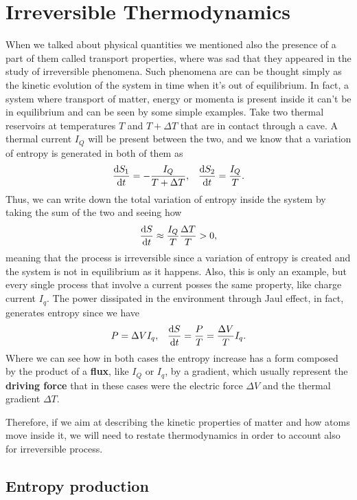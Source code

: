 \section{Irreversible Thermodynamics}

When we talked about physical quantities we mentioned also the presence of a part of them called transport properties, where was sad that they appeared in the study of irreversible phenomena. Such phenomena are can be thought simply as the kinetic evolution of the system in time when it's out of equilibrium. In fact, a system where transport of matter, energy or momenta is present inside it can't be in equilibrium and can be seen by some simple examples. Take two thermal reservoirs at temperatures $T$ and $T + \Delta T$ that are in contact through a cave. A thermal current $I_Q$ will be present between the two, and we know that a variation of entropy is generated in both of them as
\begin{align}
    &\dv{S_1}{t} = -\frac{I_Q}{T + \Delta T}, &\dv{S_2}{t} = \frac{I_Q}{T}.
\end{align}
Thus, we can write down the total variation of entropy inside the system by taking the sum of the two and seeing how
\begin{equation}
    \dv{S}{t} \approx \frac{I_Q}{T}\frac{\Delta T}{T} > 0,
\end{equation}
meaning that the process is irreversible since a variation of entropy is created and the system is not in equilibrium as it happens. Also, this is only an example, but every single process that involve a current posses the same property, like charge current $I_q$. The power dissipated in the environment through Jaul effect, in fact, generates entropy since we have
\begin{align}
    &P = \Delta V I_q, & \dv{S}{t} = \frac{P}{T} = \frac{\Delta V}{T}I_q.
\end{align}
Where we can see how in both cases the entropy increase has a form composed by the product of a \textbf{flux}, like $I_Q$ or $I_q$, by a gradient, which usually represent the \textbf{driving force} that in these cases were the electric force $\Delta V$ and the thermal gradient $\Delta T$.

Therefore, if we aim at describing the kinetic properties of matter and how atoms move inside it, we will need to restate thermodynamics in order to account also for irreversible process.

\subsection{Entropy production}

